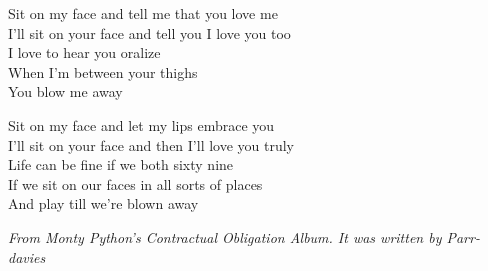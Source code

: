 \vspace{10pt}
Sit on my face and tell me that you love me\\
I'll sit on your face and tell you I love you too\\
I love to hear you oralize\\
When I'm between your thighs\\
You blow me away\par
\vspace{10pt}
Sit on my face and let my lips embrace you\\
I'll sit on your face and then I'll love you truly\\
Life can be fine if we both sixty nine\\
If we sit on our faces in all sorts of places\\
And play till we're blown away
\par
\vspace{10pt}
{\footnotesize\textit{From Monty Python's Contractual Obligation Album. It was written by Parr-davies}}
